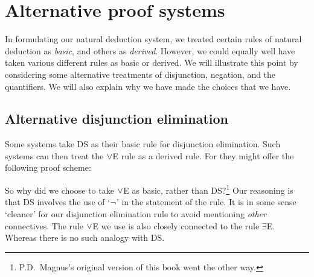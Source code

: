 
\chapter{Alternative proof systems}
In formulating our natural deduction system, we treated certain rules of natural deduction as \emph{basic}, and others as \emph{derived}. However, we could equally well have taken various different rules as basic or derived. We will illustrate this point by considering some alternative treatments of disjunction, negation, and the quantifiers. We will also explain why we have made the choices that we have.


\section{Alternative disjunction elimination}
Some systems take DS as their basic rule for disjunction elimination. Such systems can then treat the $\vee$E rule as a derived rule. For they might offer the following proof scheme: 
	\begin{pf}
		\open
			 {}
			\ellipsesline
		\close
		\open
			\ellipsesline
		\close
		\LEM
		\open
		\close
		\open
		\open
		\close
	\close
\end{pf}
So why did we choose to take $\vee$E as basic, rather than DS?\footnote{P.D.\ Magnus's original version of this book went the other way.} Our reasoning is that DS involves the use of `$\neg$' in the statement of the rule. It is in some sense `cleaner' for our disjunction elimination rule to avoid mentioning \emph{other} connectives. 
The rule $\vee$E we use is also closely connected to the rule $\exists$E. Whereas there is no such analogy with DS. 


